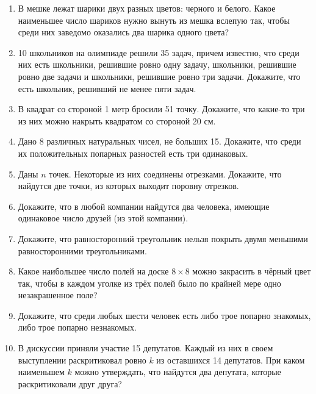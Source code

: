 \documentclass{article}
\begin{document}
\begin{enumerate}[label*=\protect\fbox{\arabic{enumi}}]
	\item В мешке лежат шарики двух разных цветов: черного и белого. Какое наименьшее число шариков нужно вынуть из мешка вслепую так, чтобы среди них заведомо оказались два шарика одного цвета?
	
	\item 10 школьников на олимпиаде решили 35 задач, причем известно, что среди них есть школьники, решившие ровно одну задачу, школьники, решившие ровно две задачи и школьники, решившие ровно три задачи. Докажите, что есть школьник, решивший не менее пяти задач.
	
	\item В квадрат со стороной 1 метр бросили 51 точку. Докажите, что какие-то три из них можно накрыть квадратом со стороной 20 см.
	
	\item Дано 8 различных натуральных чисел, не больших 15. Докажите, что среди их положительных попарных разностей есть три одинаковых.
	
	\item Даны $n$ точек. Некоторые из них соединены отрезками. Докажите, что найдутся две точки, из которых выходит поровну отрезков.
	
	\item Докажите, что в любой компании найдутся два человека, имеющие одинаковое число друзей (из этой компании).
	
	\item Докажите, что равносторонний треугольник нельзя покрыть двумя меньшими равносторонними треугольниками.
	
	\item Какое наибольшее число полей на доске $8 \times 8$ можно закрасить в чёрный цвет так, чтобы в каждом уголке из трёх полей было по крайней мере одно незакрашенное поле? 
	
	\item Докажите, что среди любых шести человек есть либо трое попарно знакомых, либо трое попарно незнакомых.
	
	\item В дискуссии приняли участие 15 депутатов. Каждый из них в своем выступлении раскритиковал ровно $k$ из оставшихся 14 депутатов. При каком наименьшем $k$ можно утверждать, что найдутся два депутата, которые раскритиковали друг друга?
\end{enumerate}
\end{document}
